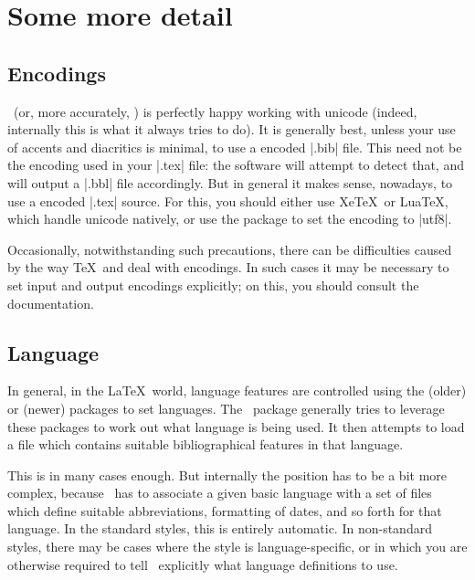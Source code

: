 \section{Some more detail}

\subsection{Encodings}

\biblatex\ (or, more accurately, ) is perfectly
happy working with unicode (indeed, internally this is what it always
tries to do). It is generally best, unless your use of accents and
diacritics is minimal, to use a  encoded |.bib|
file. This need not be the encoding used in your |.tex| file: the
software will attempt to detect that, and will output a |.bbl| file
accordingly. But in general it makes sense, nowadays, to use a
 encoded |.tex| source. For this, you should either
use Xe\TeX\ or Lua\TeX, which handle unicode natively, or use the
 package to set the encoding to |utf8|.

Occasionally, notwithstanding such precautions, there can be
difficulties caused by the way \TeX\ and  deal with
encodings. In such cases it may be necessary to set input and output
encodings explicitly; on this, you should consult the 
documentation.

\subsection{Language}

In general, in the \LaTeX\ world, language features are controlled
using the (older)  or (newer) 
packages to set languages. The \biblatex\ package generally tries to
leverage these packages to work out what language is being used. It
then attempts to load a file which contains suitable bibliographical
features in that language.

This is in many cases enough. But internally the position has to be a
bit more complex, because \biblatex\ has to associate a given basic
language with a set of files which define suitable abbreviations,
formatting of dates, and so forth for that language. In the standard
styles, this is entirely automatic. In non-standard styles, there may
be cases where the style is language-specific, or in which you are
otherwise required to tell \biblatex\ explicitly what language
definitions to use.

